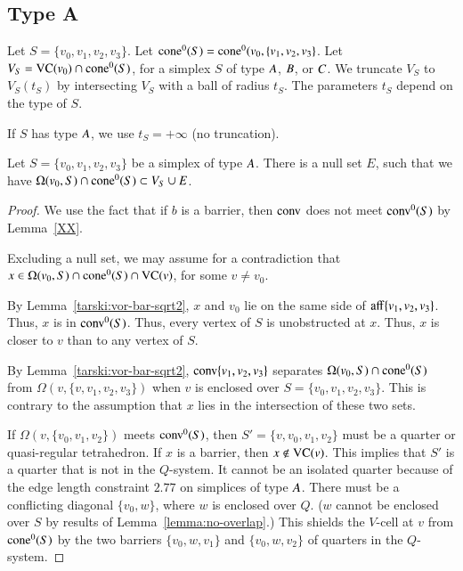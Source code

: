 \subsection{Type A}%
    \label{sec:separation}

Let $S = \{v_0,v_1,v_2,v_3\}$.
Let ${\operatorname{cone}}^0(S) = {\operatorname{cone}}^0(v_0,\{v_1,v_2,v_3\}$.
Let $V_S = {\operatorname{VC}}(v_0)\cap {\operatorname{cone}}^0(S)$, for a simplex $S$ of type $A$,
$B$, or $C$. 
We truncate $V_S$ to $V_S(t_S)$ by intersecting
$V_S$ with a ball of radius $t_S$.  The parameters $t_S$ depend on
the type of $S$.

If $S$ has type $A$, we use $t_S=+\infty$ (no truncation).

\begin{lemma} Let $S=\{v_0,v_1,v_2,v_3\}$ be a simplex of type $A$.
There is a null set $E$, such that
we have  $ \Omega(v_0,S) \cap {\operatorname{cone}}^0(S) \subset V_S \cup E$.
\end{lemma}

\begin{proof} 
We use the fact that if $b$ is a barrier, then ${\operatorname{conv}}$ does
not meet ${\operatorname{conv}}^0(S)$ by Lemma~\ref{XX}.  


Excluding a null set, we may assume 
for a contradiction that
$x\in \Omega(v_0,S) \cap {\operatorname{cone}}^0(S) \cap {\operatorname{VC}}(v)$,
for some $v\ne v_0$.  

By Lemma~\ref{tarski:vor-bar-sqrt2}, $x$ and $v_0$ lie on the
same side of ${\operatorname{aff}}\{v_1,v_2,v_3\}$.  Thus, $x$ is in
${\operatorname{conv}}^0(S)$.  
Thus, every vertex of $S$ is unobstructed at $x$.  Thus, $x$
is closer to $v$ than to any vertex of $S$.

By Lemma~\ref{tarski:vor-bar-sqrt2}, ${\operatorname{conv}}\{v_1,v_2,v_3\}$ 
separates
$\Omega(v_0,S)\cap {\operatorname{cone}}^0(S)$ from $\Omega(v,\{v,v_1,v_2,v_3\})$ when
$v$ is enclosed over $S=\{v_0,v_1,v_2,v_3\}$.  This is contrary
to the assumption that $x$ lies in the intersection of these
two sets.

If $\Omega(v,\{v_0,v_1,v_2\})$ meets ${\operatorname{conv}}^0(S)$, then
$S'=\{v,v_0,v_1,v_2\}$ must be a quarter or quasi-regular tetrahedron.
If $x$ is a barrier, then $x\not\in{\operatorname{VC}}(v)$.  This implies
that $S'$ is a quarter that is not in the $Q$-system.
It
cannot be an isolated quarter because of the edge length
constraint $2.77$ on simplices of type $A$.
There must be a
conflicting diagonal $\{v_0,w\}$, where $w$ is enclosed over $Q$. ($w$
cannot be enclosed over $S$ by results of
Lemma~\ref{lemma:no-overlap}.) This shields the $V$-cell at $v$
from ${\operatorname{cone}}^0(S)$ by the two barriers $\{v_0,w,v_1\}$ and $\{v_0,w,v_2\}$ of
quarters in the $Q$-system.
\end{proof}


